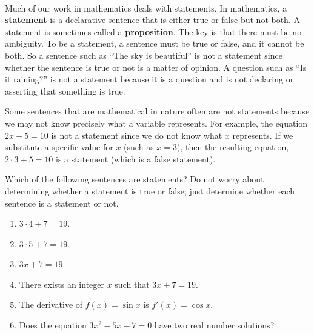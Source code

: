 %
\begin{previewactivity}\label{PA:prop} \hfill \\
Much of our work in mathematics deals with statements.  In mathematics, a \textbf{statement}
%
  is a declarative sentence that is either true or false but not both.    
A statement is sometimes called a \textbf{proposition}.
%
The key is that there must be no ambiguity.  To be a statement, a sentence must be  true or false, and it cannot be both.  So a sentence such as ``The sky is beautiful'' is not a statement since whether the sentence is true or not is a matter of opinion.  A question such as ``Is it raining?'' is not a statement because it is a question and is not declaring or asserting that something is true.

Some sentences that are mathematical in nature often are not statements because we may not know precisely what a variable represents.  For example, the equation $2x + 5 = 10$ is not a statement since we do not know what $x$ represents.  If we substitute a specific value for $x$ (such as $x = 3$), then the resulting equation, $2 \cdot 3 + 5 = 10$ is a statement (which is a false statement). 


\noindent
Which of the following sentences are statements?  Do not worry about determining whether a statement is true or false; just determine whether each sentence is a statement or not.
\begin{multicols}{2}
\begin{enumerate}
\item $3 \cdot 4 + 7 = 19$.
\item $3 \cdot 5 + 7 = 19$.
\item $3x + 7 = 19$.
\end{enumerate}
\end{multicols}
\begin{enumerate} \setcounter{enumi}{3}
  \item There exists an integer $x$ such that $3x + 7 = 19$.
\item The derivative of $f(x) = \sin x$ is $f'(x) = \cos x$.
\item Does the equation $3x^2 - 5x - 7 = 0$ have two real number solutions?
\end{enumerate}


\end{previewactivity}
